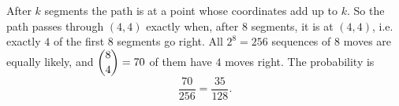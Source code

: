 After $k$ segments the path is at a point whose coordinates add up to $k$. So the path passes through $(4,4)$ exactly when, after $8$ segments, it is at $(4,4)$, i.e. exactly $4$ of the first $8$ segments go right. All $2^8=256$ sequences of $8$ moves are equally likely, and $\dbinom84=70$ of them have $4$ moves right. The probability is
\[\dfrac{70}{256}=\boxed{\dfrac{35}{128}}.\]

